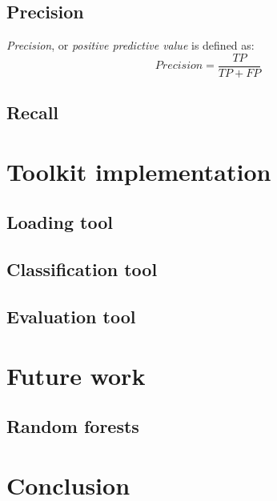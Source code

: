 \documentclass{article}
\begin{document}
    \subsection{Precision}
      {\it Precision}, or {\it positive predictive value} is defined as:
      \begin{displaymath}
        Precision = \frac{TP}{TP + FP}
      \end{displaymath}
    \subsection{Recall}
  \newpage
  \section{Toolkit implementation}
    \subsection{Loading tool}
    \newpage
    \subsection{Classification tool}
    \newpage
    \subsection{Evaluation tool}
    \newpage
  \section{Future work}
    \subsection{Random forests}
    \newpage
  \section*{Conclusion}
\end{document}
